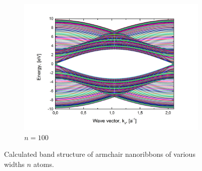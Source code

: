 \begin{figure}[hb!]
\begin{subfigure}{.5\textwidth}
  \includegraphics[width=\linewidth]{img/ac_ribbon_100}
  \caption{$n=100$}
  \label{fig:ac100}
\end{subfigure}
\caption{Calculated band structure of armchair nanoribbons of various widths $n$ atoms. \label{fig:ac_ribbons}}
\end{figure}

